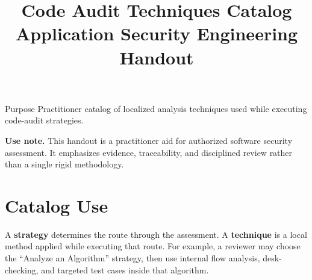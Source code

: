 \documentclass[10pt]{article}
\title{\textbf{Code Audit Techniques Catalog}\\\large Application Security Engineering Handout}
\author{}
\date{}
\begin{document}
\maketitle
\thispagestyle{empty}
\begin{keybox}{Purpose}
Practitioner catalog of localized analysis techniques used while executing code-audit strategies.
\end{keybox}
\vfill
\noindent\textbf{Use note.} This handout is a practitioner aid for authorized software security assessment. It emphasizes evidence, traceability, and disciplined review rather than a single rigid methodology.
\newpage
\tableofcontents
\newpage

\section{Catalog Use}
A \textbf{strategy} determines the route through the assessment. A \textbf{technique} is a local method applied while executing that route. For example, a reviewer may choose the ``Analyze an Algorithm'' strategy, then use internal flow analysis, desk-checking, and targeted test cases inside that algorithm.

\begin{center}
\end{center}
\end{document}
